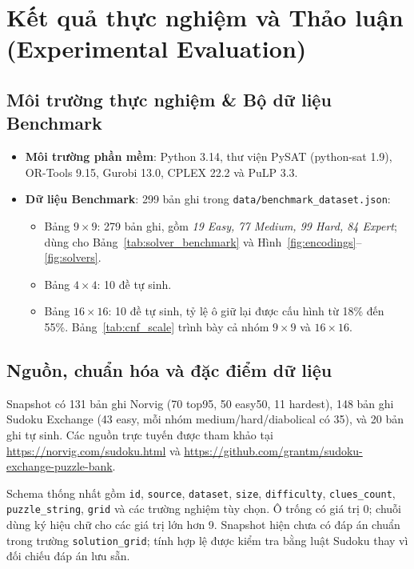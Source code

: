 \documentclass[a4paper,fleqn,nologo]{cas-sc}
\begin{document}
\section{Kết quả thực nghiệm và Thảo luận (Experimental Evaluation)}
\label{sec:exp}

\subsection{Môi trường thực nghiệm \& Bộ dữ liệu Benchmark}
\begin{itemize}
    \item \textbf{Môi trường phần mềm}: Python 3.14, thư viện PySAT (python-sat 1.9), OR-Tools 9.15, Gurobi 13.0, CPLEX 22.2 và PuLP 3.3.
    \item \textbf{Dữ liệu Benchmark}: 299 bản ghi trong \texttt{data/benchmark\_dataset.json}:
    \begin{itemize}
        \item Bảng $9\times9$: 279 bản ghi, gồm \textit{19 Easy, 77 Medium, 99 Hard, 84 Expert}; dùng cho Bảng~\ref{tab:solver_benchmark} và Hình~\ref{fig:encodings}--\ref{fig:solvers}.
        \item Bảng $4\times4$: 10 đề tự sinh.
        \item Bảng $16\times16$: 10 đề tự sinh, tỷ lệ ô giữ lại được cấu hình từ 18\% đến 55\%. Bảng~\ref{tab:cnf_scale} trình bày cả nhóm $9\times9$ và $16\times16$.
    \end{itemize}
\end{itemize}

\subsection{Nguồn, chuẩn hóa và đặc điểm dữ liệu}
Snapshot có 131 bản ghi Norvig (70 top95, 50 easy50, 11 hardest), 148 bản ghi Sudoku Exchange (43 easy, mỗi nhóm medium/hard/diabolical có 35), và 20 bản ghi tự sinh. Các nguồn trực tuyến được tham khảo tại \url{https://norvig.com/sudoku.html} và \url{https://github.com/grantm/sudoku-exchange-puzzle-bank}.

Schema thống nhất gồm \texttt{id}, \texttt{source}, \texttt{dataset}, \texttt{size}, \texttt{difficulty}, \texttt{clues\_count}, \texttt{puzzle\_string}, \texttt{grid} và các trường nghiệm tùy chọn. Ô trống có giá trị 0; chuỗi dùng ký hiệu chữ cho các giá trị lớn hơn 9. Snapshot hiện chưa có đáp án chuẩn trong trường \texttt{solution\_grid}; tính hợp lệ được kiểm tra bằng luật Sudoku thay vì đối chiếu đáp án lưu sẵn.
\end{document}
